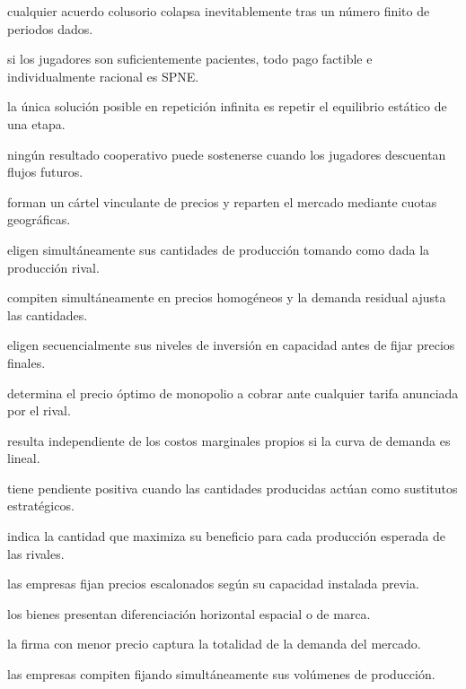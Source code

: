 \begin{opts}
    \item cualquier acuerdo colusorio colapsa inevitablemente tras un número finito de periodos dados.
    \item si los jugadores son suficientemente pacientes, todo pago factible e individualmente racional es SPNE.
    \item la única solución posible en repetición infinita es repetir el equilibrio estático de una etapa.
    \item ningún resultado cooperativo puede sostenerse cuando los jugadores descuentan flujos futuros.
\end{opts}

\begin{opts}
    \item forman un cártel vinculante de precios y reparten el mercado mediante cuotas geográficas.
    \item eligen simultáneamente sus cantidades de producción tomando como dada la producción rival.
    \item compiten simultáneamente en precios homogéneos y la demanda residual ajusta las cantidades.
    \item eligen secuencialmente sus niveles de inversión en capacidad antes de fijar precios finales.
\end{opts}

\begin{opts}
    \item determina el precio óptimo de monopolio a cobrar ante cualquier tarifa anunciada por el rival.
    \item resulta independiente de los costos marginales propios si la curva de demanda es lineal.
    \item tiene pendiente positiva cuando las cantidades producidas actúan como sustitutos estratégicos.
    \item indica la cantidad que maximiza su beneficio para cada producción esperada de las rivales.
\end{opts}

\begin{opts}
    \item las empresas fijan precios escalonados según su capacidad instalada previa.
    \item los bienes presentan diferenciación horizontal espacial o de marca.
    \item la firma con menor precio captura la totalidad de la demanda del mercado.
    \item las empresas compiten fijando simultáneamente sus volúmenes de producción.
\end{opts}

